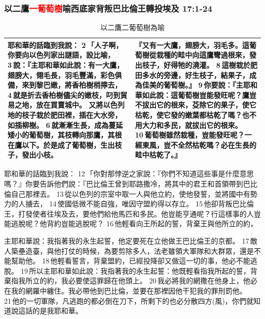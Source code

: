 \subsubsection{以二鷹\textcolor{red}{一葡萄樹}喻西底家背叛巴比倫王轉投埃及 17:1-24}
\begin{table}[H]
\centering 
\begin{tabular}{p{8.6cm}|p{8.5cm}}\hline\hline
耶和華的話臨到我說： 2 「人子啊，你要向以色列家出謎語，設比喻， 3 說：『主耶和華如此說：有一大鷹，翅膀大，翎毛長，羽毛豐滿，彩色俱備，來到黎巴嫩，將香柏樹梢擰去， 4 就是折去香柏樹儘尖的嫩枝，叼到貿易之地，放在買賣城中。 
又將以色列地的枝子栽於肥田裡，插在大水旁，如插柳樹。 6 就漸漸生長，成為蔓延矮小的葡萄樹，其枝轉向那鷹，其根在鷹以下。於是成了葡萄樹，生出枝子，發出小枝。
&『又有一大鷹，翅膀大，羽毛多。這葡萄樹從栽種的畦中向這鷹彎過根來，發出枝子，好得牠的澆灌。 8 這樹栽於肥田多水的旁邊，好生枝子，結果子，成為佳美的葡萄樹。』 9 你要說：『主耶和華如此說：這葡萄樹豈能發旺呢？鷹豈不拔出它的根來，芟除它的果子，使它枯乾，使它發的嫩葉都枯乾了嗎？也不用大力和多民，就拔出它的根來。 10 葡萄樹雖然栽種，豈能發旺呢？一經東風，豈不全然枯乾嗎？必在生長的畦中枯乾了。』\\\hline
\end{tabular}
\caption{以二鷹二葡萄樹為喻}
\end{table}


耶和華的話臨到我說： 12 「你對那悖逆之家說：『你們不知道這些事是什麼意思嗎？』你要告訴他們說：『巴比倫王曾到耶路撒冷，將其中的君王和首領帶到巴比倫自己那裡去。 13 從以色列的宗室中取一人與他立約，使他發誓，並將國中有勢力的人擄去， 14 使國低微不能自強，唯因守盟約得以存立。 15 他卻背叛巴比倫王，打發使者往埃及去，要他們給他馬匹和多民。他豈能亨通呢？行這樣事的人豈能逃脫呢？他背約豈能逃脫呢？ 16 他輕看向王所起的誓，背棄王與他所立的約，

主耶和華說：我指著我的永生起誓，他定要死在立他做王巴比倫王的京都。 17 敵人築壘造臺，與他打仗的時候，為要剪除多人，法老雖領大軍隊和大群眾，還是不能幫助他。 18 他輕看誓言，背棄盟約，已經投降卻又做這一切的事，他必不能逃脫。 19 所以主耶和華如此說：我指著我的永生起誓：他既輕看指我所起的誓，背棄指我所立的約，我必要使這罪歸在他頭上。 20 我必將我的網撒在他身上，他必在我的網羅中纏住。我必帶他到巴比倫，並要在那裡因他干犯我的罪刑罰他。 21 他的一切軍隊，凡逃跑的都必倒在刀下，所剩下的也必分散四方(風)，你們就知道說這話的是我耶和華。


